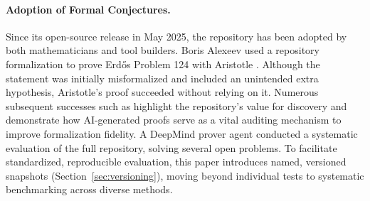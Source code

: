\paragraph{Adoption of Formal Conjectures.}
Since its open-source release in May 2025, the repository has been adopted by both mathematicians and tool builders.
Boris Alexeev used a repository formalization to prove Erd\H{o}s Problem 124 \citep{erdos124} with Aristotle \citep{achim2025aristotle}.
Although the statement was initially misformalized and included an unintended extra hypothesis, Aristotle’s proof succeeded without relying on it.
Numerous subsequent successes such as \citep{alexeev25} highlight the repository’s value for discovery and demonstrate how AI-generated proofs serve as a vital auditing mechanism to improve formalization fidelity.
A DeepMind prover agent \citep{DMProverAgent26} conducted a systematic evaluation of the full repository, solving several open problems.
To facilitate standardized, reproducible evaluation, this paper introduces named, versioned snapshots (Section~\ref{sec:versioning}), moving beyond individual tests to systematic benchmarking across diverse methods.
